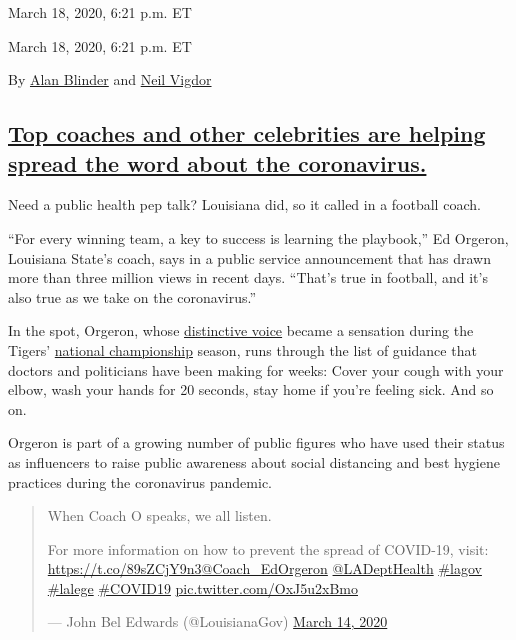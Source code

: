 March 18, 2020, 6:21 p.m. ET

March 18, 2020, 6:21 p.m. ET

By \href{https://www.nytimes3xbfgragh.onion/by/alan-blinder}{Alan
Blinder} and
\href{https://www.nytimes3xbfgragh.onion/by/neil-vigdor}{Neil Vigdor}

\hypertarget{top-coaches-and-other-celebrities-are-helping-spread-the-word-about-the-coronavirus}{%
\subsection{\texorpdfstring{\protect\hyperlink{top-coaches-and-other-celebrities-are-helping-spread-the-word-about-the-coronavirus}{Top
coaches and other celebrities are helping spread the word about the
coronavirus.}}{Top coaches and other celebrities are helping spread the word about the coronavirus.}}\label{top-coaches-and-other-celebrities-are-helping-spread-the-word-about-the-coronavirus}}

Need a public health pep talk? Louisiana did, so it called in a football
coach.

``For every winning team, a key to success is learning the playbook,''
Ed Orgeron, Louisiana State's coach, says in a public service
announcement that has drawn more than three million views in recent
days. ``That's true in football, and it's also true as we take on the
coronavirus.''

In the spot, Orgeron, whose
\href{https://www.nytimes3xbfgragh.onion/2020/01/09/sports/ncaafootball/ed-orgeron.html}{distinctive
voice} became a sensation during the Tigers'
\href{https://www.nytimes3xbfgragh.onion/2020/01/13/sports/ncaafootball/clemson-lsu.html}{national
championship} season, runs through the list of guidance that doctors and
politicians have been making for weeks: Cover your cough with your
elbow, wash your hands for 20 seconds, stay home if you're feeling sick.
And so on.

Orgeron is part of a growing number of public figures who have used
their status as influencers to raise public awareness about social
distancing and best hygiene practices during the coronavirus pandemic.

\begin{quote}
When Coach O speaks, we all listen.

For more information on how to prevent the spread of COVID-19, visit:
\url{https://t.co/89sZCjY9n3}\href{https://twitter.com/Coach_EdOrgeron?ref_src=twsrc\%5Etfw}{@Coach\_EdOrgeron}
\href{https://twitter.com/LADeptHealth?ref_src=twsrc\%5Etfw}{@LADeptHealth}
\href{https://twitter.com/hashtag/lagov?src=hash\&ref_src=twsrc\%5Etfw}{\#lagov}
\href{https://twitter.com/hashtag/lalege?src=hash\&ref_src=twsrc\%5Etfw}{\#lalege}
\href{https://twitter.com/hashtag/COVID19?src=hash\&ref_src=twsrc\%5Etfw}{\#COVID19}
\href{https://t.co/OxJ5u2xBmo}{pic.twitter.com/OxJ5u2xBmo}

--- John Bel Edwards (@LouisianaGov)
\href{https://twitter.com/LouisianaGov/status/1238905211110019073?ref_src=twsrc\%5Etfw}{March
14, 2020}
\end{quote}

